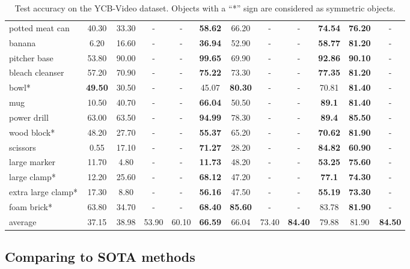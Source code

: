 \documentclass[10pt,twocolumn,letterpaper]{article}
\begin{document}
\begin{table*}[h]
\begin{center}
\begin{tabular}{l|ccccc||cccc|cc}
potted meat can  & 40.30 & 33.30 & - & - & \textbf{58.62} & 66.20 & - & - & \textbf{74.54} & \textbf{76.20} & - \\
banana  & 6.20 & 16.60 & - & - & \textbf{36.94} & 52.90 & - & - & \textbf{58.77} & \textbf{81.20} & - \\
pitcher base  & 53.80 & 90.00 & - & - & \textbf{99.65} & 69.90 & - & - & \textbf{92.86} & \textbf{90.10} & - \\
bleach cleanser  & 57.20 & 70.90 & - & - & \textbf{75.22} & 73.30 & - & - & \textbf{77.35} & \textbf{81.20} & - \\
bowl*  & \textbf{49.50} & 30.50 & - & - & 45.07 & \textbf{80.30} & - & - & 70.81 & \textbf{81.40} & - \\
mug  & 10.50 & 40.70 & - & - & \textbf{66.04} & 50.50 & - & - & \textbf{89.1} & \textbf{81.40} & - \\
power drill  & 63.00 & 63.50 & - & - & \textbf{94.99} & 78.30 & - & - & \textbf{89.4} & \textbf{85.50} & - \\
wood block*  & 48.20 & 27.70 & - & - & \textbf{55.37} & 65.20 & - & - & \textbf{70.62} & \textbf{81.90} & - \\
scissors  & 0.55 & 17.10 & - & - & \textbf{71.27} & 28.20 & - & - & \textbf{84.82} & \textbf{60.90} & - \\
large marker  & 11.70 & 4.80 & - & - & \textbf{11.73} & 48.20 & - & - & \textbf{53.25} & \textbf{75.60} & - \\
large clamp*  & 12.20 & 25.60 & - & - & \textbf{68.12} & 47.20 & - & - & \textbf{77.1} & \textbf{74.30} & - \\
extra large clamp*  & 17.30 & 8.80 & - & - & \textbf{56.16} & 47.50 & - & - & \textbf{55.19} & \textbf{73.30} & - \\
foam brick*  & 63.80 & 34.70 & - & - & \textbf{68.40} & \textbf{85.60} & - & - & 83.78 & \textbf{81.90} & - \\
  \hline
average & 37.15 & 38.98 & 53.90 & 60.10 & \textbf{66.59} & 66.04 & 73.40 & \textbf{84.40} & 79.88 & 81.90 & \textbf{84.50} \\
\hline
 \end{tabular}
\end{center}
\caption{
Test accuracy on the YCB-Video dataset. Objects with a ``*'' sign are considered as symmetric objects.}
\label{tab:ycbv}
\end{table*}


\subsection{Comparing to SOTA methods}
\end{document}

